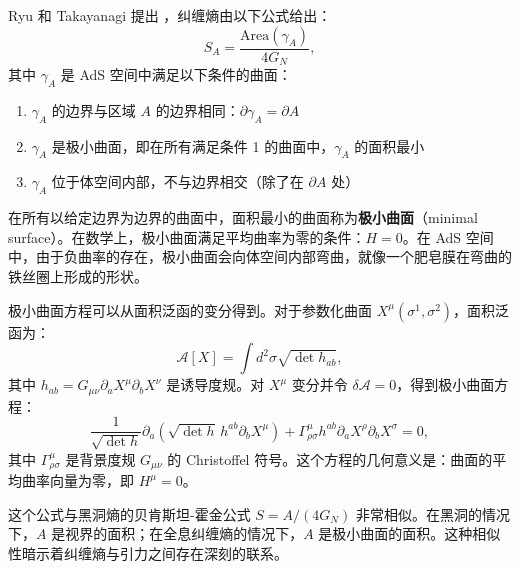 \begin{theorem}[极小曲面与纠缠熵公式] \label{thm:RT}
Ryu 和 Takayanagi 提出 \cite{Ryu2006}，纠缠熵由以下公式给出：
\begin{equation}
    S_A = \frac{\text{Area}(\gamma_A)}{4 G_N},
    \label{eq:RT}
\end{equation}
其中 $\gamma_A$ 是 AdS 空间中满足以下条件的曲面：
\begin{enumerate}
    \item $\gamma_A$ 的边界与区域 $A$ 的边界相同：$\partial \gamma_A = \partial A$
    \item $\gamma_A$ 是极小曲面，即在所有满足条件 1 的曲面中，$\gamma_A$ 的面积最小
    \item $\gamma_A$ 位于体空间内部，不与边界相交（除了在 $\partial A$ 处）
\end{enumerate}
\end{theorem}

\begin{definition}[极小曲面]
在所有以给定边界为边界的曲面中，面积最小的曲面称为\textbf{极小曲面}（minimal surface）。在数学上，极小曲面满足平均曲率为零的条件：$H = 0$。在 AdS 空间中，由于负曲率的存在，极小曲面会向体空间内部弯曲，就像一个肥皂膜在弯曲的铁丝圈上形成的形状。
\end{definition}

\begin{remark}[极小曲面方程的推导]
极小曲面方程可以从面积泛函的变分得到。对于参数化曲面 $X^\mu(\sigma^1, \sigma^2)$，面积泛函为：
\begin{equation}
    \mathcal{A}[X] = \int d^2\sigma \sqrt{\det h_{ab}},
\end{equation}
其中 $h_{ab} = G_{\mu\nu} \partial_a X^\mu \partial_b X^\nu$ 是诱导度规。对 $X^\mu$ 变分并令 $\delta \mathcal{A} = 0$，得到极小曲面方程：
\begin{equation}
    \frac{1}{\sqrt{\det h}} \partial_a \left( \sqrt{\det h} \, h^{ab} \partial_b X^\mu \right) + \Gamma^\mu_{\rho\sigma} h^{ab} \partial_a X^\rho \partial_b X^\sigma = 0,
\end{equation}
其中 $\Gamma^\mu_{\rho\sigma}$ 是背景度规 $G_{\mu\nu}$ 的 Christoffel 符号。这个方程的几何意义是：曲面的平均曲率向量为零，即 $H^\mu = 0$。
\end{remark}

\begin{remark}[与黑洞熵的类比]
这个公式与黑洞熵的贝肯斯坦-霍金公式 $S = A/(4G_N)$ 非常相似。在黑洞的情况下，$A$ 是视界的面积；在全息纠缠熵的情况下，$A$ 是极小曲面的面积。这种相似性暗示着纠缠熵与引力之间存在深刻的联系。
\end{remark}

